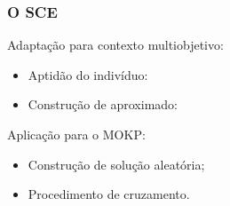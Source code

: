 \documentclass[10pt,xcolor=table,fleqn]{beamer}
\begin{document}
\begin{frame}
	\frametitle{O SCE}
  \begin{block}{Adaptação para contexto multiobjetivo:}
    \begin{itemize}
      \item{ Aptidão do indivíduo:
      }
      \item{ Construção de \paretoset{} aproximado:
      }
    \end{itemize}
  \end{block}
  \pause
  \pause
  \begin{block}{Aplicação para o MOKP:}
    \begin{itemize}
      \item{ Construção de solução aleatória;}
      \item{ Procedimento de cruzamento.}
    \end{itemize}
  \end{block}
\end{frame}
\end{document}
